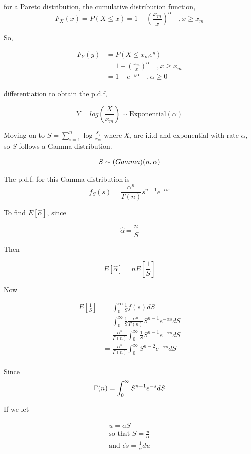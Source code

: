 \documentclass[]{article}
\begin{document}
for a Pareto distribution, the cumulative distribution function,
$$
F_X(x) = P(X\leq x) = 1 - \left( \frac{x_m}{x} \right)^\alpha \quad ,x \ge x_m
$$

So,

\begin{align*}
	F_Y(y) &= P(X \leq x_m e^{y}) \\
			&= 1 - \left( \frac{x_m}{x} \right)^\alpha \quad ,x \ge x_m \\
			& = 1 - e^{-y\alpha} \quad , \alpha \ge 0
\end{align*}

\noindent differentiation to obtain the p.d.f,

$$
Y = log \left(\frac{X}{x_m}\right) \sim \text{Exponential}(\alpha)
$$

\noindent Moving on to $S = \sum_{i=1}^{n} \log \frac{X_i}{x_m}$ where $X_i$ are i.i.d and exponential with rate $\alpha$, so $S$ follows a Gamma distribution.

$$
S \sim \text(Gamma) (n, \alpha)
$$

\noindent The p.d.f. for this Gamma distribution is
$$
f_S(s) = \frac{\alpha^n}{\Gamma (n)} s^{n-1} e^{-\alpha s}
$$

\noindent To find $E[\hat{\alpha}]$, since

$$
\hat{\alpha} = \frac{n}{S}
$$

\noindent Then

$$
E\left[\hat{\alpha}\right] = n E[\frac{1}{S}]
$$

\noindent Now

\begin{align*}
E \left[\frac{1}{S}\right] &= \int_{0}^{\infty} \frac{1}{S} f(s) dS\\
							&= \int_{0}^{\infty} \frac{1}{S}  \frac{\alpha^n}{\Gamma (n)} S^{n-1} e^{-\alpha s} dS \\
							&= \frac{\alpha^n}{\Gamma (n)} \int_{0}^{\infty} \frac{1}{S} S^{n-1} e^{-\alpha s} dS \\
							&= \frac{\alpha^n}{\Gamma (n)} \int_{0}^{\infty} S^{n-2} e^{-\alpha s} dS \\
\end{align*}

\noindent Since 
$$
\Gamma(n) = \int_{0}^{\infty} S^{n-1} e^{-s} dS \\
$$

\noindent If we let

\begin{align*}
u = \alpha S\\
\text{so that } S=\frac{u}{\alpha}\\
\text{and } ds = \frac{1}{\alpha} du
\end{align*}
\end{document}
